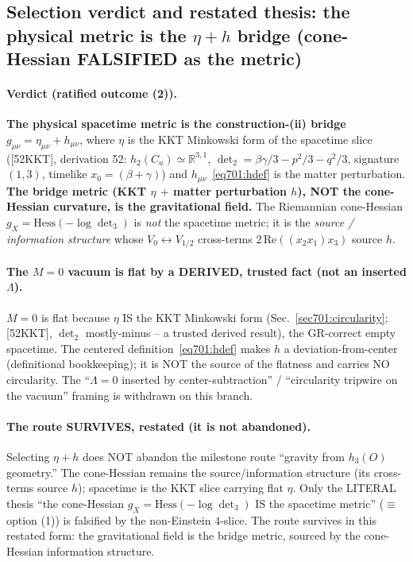 \subsection{Selection verdict and restated thesis: the physical metric is the
            $\eta+h$ bridge (cone-Hessian FALSIFIED as the metric)}
\label{sec701:selection}

\paragraph{Verdict (ratified outcome (2)).} \textbf{The physical spacetime metric is the
construction-(ii) bridge $g_{\mu\nu}=\eta_{\mu\nu}+h_{\mu\nu}$}, where $\eta$ is the KKT
Minkowski form of the spacetime slice ([52KKT], derivation 52: $h_2(C_u)\simeq\mathbb{R}^{3,1}$,
$\det_2 = \beta\gamma/3-p^2/3-q^2/3$, signature $(1,3)$, timelike $x_0=(\beta+\gamma)$) and
$h_{\mu\nu}$~\eqref{eq701:hdef} is the matter perturbation. \textbf{The bridge metric (KKT
$\eta$ $+$ matter perturbation $h$), NOT the cone-Hessian curvature, is the gravitational
field.} The Riemannian cone-Hessian $g_X=\mathrm{Hess}(-\log\det_3)$ is \emph{not} the
spacetime metric; it is the \emph{source / information structure} whose
$V_0\!\leftrightarrow\!V_{1/2}$ cross-terms $2\,\mathrm{Re}((x_2 x_1)x_3)$ source $h$.

\paragraph{The $M=0$ vacuum is flat by a DERIVED, trusted fact (not an inserted
$\Lambda$).} $M=0$ is flat because $\eta$ IS the KKT Minkowski form
(Sec.~\ref{sec701:circularity}; [52KKT], $\det_2$ mostly-minus -- a trusted derived
result), the GR-correct empty spacetime. The centered definition~\eqref{eq701:hdef} makes
$h$ a deviation-from-center (definitional bookkeeping); it is NOT the source of the
flatness and carries NO circularity. The ``$\Lambda=0$ inserted by center-subtraction'' /
``circularity tripwire on the vacuum'' framing is withdrawn on this branch.

\paragraph{The route SURVIVES, restated (it is not abandoned).} Selecting $\eta+h$ does
NOT abandon the milestone route ``gravity from $h_3(O)$ geometry.'' The cone-Hessian
remains the source/information structure (its cross-terms source $h$); spacetime is the
KKT slice carrying flat $\eta$. Only the LITERAL thesis ``the cone-Hessian
$g_X=\mathrm{Hess}(-\log\det_3)$ IS the spacetime metric'' ($\equiv$ option (1)) is
falsified by the non-Einstein $4$-slice. The route survives in this restated form: the
gravitational field is the bridge metric, sourced by the cone-Hessian information
structure.

